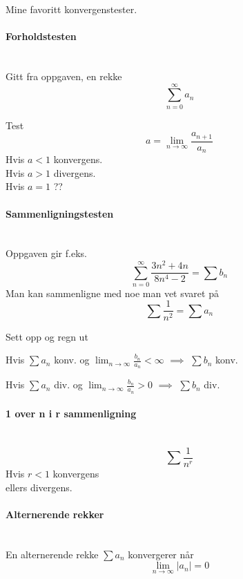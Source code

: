 Mine favoritt konvergenstester.

\paragraph{Forholdstesten} \mbox{} \\
Gitt fra oppgaven, en rekke
$$\sum_{n=0}^{\infty} a_n$$

Test
$$a = \lim_{n \to \infty} \frac{a_{n+1}}{a_n}$$
Hvis $a < 1$ konvergens. \\
Hvis $a > 1$ divergens. \\
Hvis $a = 1$ ??



\paragraph{Sammenligningstesten} \mbox{} \\
Oppgaven gir f.eks.
$$\sum_{n=0}^{\infty}\frac{3n^2+4n}{8n^4-2} = \sum b_n$$
Man kan sammenligne med noe man vet svaret på
$$\sum \frac{1}{n^2} = \sum a_n$$

Sett opp og regn ut

Hvis $\sum a_n$ konv. og
$\lim_{n \to \infty} \frac{b_n}{a_n} < \infty$
$\implies$ $\sum b_n$ konv.

Hvis $\sum a_n$ div. og
$\lim_{n \to \infty} \frac{b_n}{a_n} > 0$
$\implies$ $\sum b_n$ div.



\paragraph{1 over n i r sammenligning} \mbox{} \\
$$\sum \frac{1}{n^r}$$
Hvis $r < 1$ konvergens\\
ellers divergens.



\paragraph{Alternerende rekker} \mbox{} \\
En alternerende rekke $\sum a_n$ konvergerer når
$$\lim_{n \to \infty} |a_n| = 0$$
